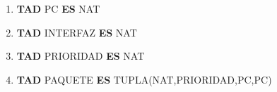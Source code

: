 \documentclass[a4paper,spanish, 10pt]{article}
\begin{document}
\pagestyle{fancy}
\thispagestyle{fancy}
\addtolength{\headheight}{1pt}
\cfoot{\thepage /\pageref{LastPage}}
\renewcommand{\footrulewidth}{0.4pt}

\author{Algoritmos y Estructuras de Datos II, DC, UBA.}
\date{}
\title{}





 	\begin{enumerate}
 	    \item \textbf{TAD} PC \textbf{ES} NAT
	    \item \textbf{TAD} INTERFAZ \textbf{ES} NAT
	    \item \textbf{TAD} PRIORIDAD \textbf{ES} NAT
	    \item \textbf{TAD} PAQUETE \textbf{ES} TUPLA(NAT,PRIORIDAD,PC,PC)
	\end{enumerate}




\end{document}
